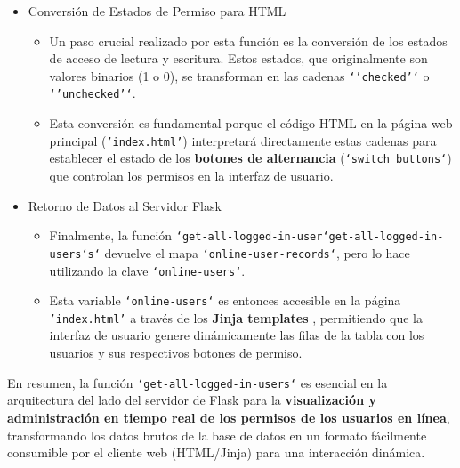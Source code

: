 \documentclass{report}
\begin{document}
\begin{itemize}
    \item Conversión de Estados de Permiso para HTML
        \begin{itemize}
            \item Un paso crucial realizado por esta función es la conversión de los estados de acceso de lectura y escritura. Estos estados, que originalmente 
            son valores binarios (1 o 0), se transforman en las cadenas \texttt{`'checked'`} o \texttt{`'unchecked'`}.
            \item Esta conversión es fundamental porque el código HTML en la página web principal (\texttt{'index.html'}) interpretará directamente estas 
            cadenas para establecer el estado de los \textbf{botones de alternancia} (\texttt{`switch buttons`}) que controlan los permisos en la interfaz 
            de usuario.
        \end{itemize}

    \item Retorno de Datos al Servidor Flask
        \begin{itemize}
            \item Finalmente, la función \texttt{`get-all-logged-in-user`get-all-logged-in-users`s`} devuelve el mapa \texttt{`online-user-records`}, 
            pero lo hace utilizando la clave \texttt{`online-users`}.
            \item Esta variable \texttt{`online-users`} es entonces accesible en la página \texttt{'index.html'} a través de los \textbf{ Jinja templates }, 
            permitiendo que la interfaz de usuario genere dinámicamente las filas de la tabla con los usuarios y sus respectivos botones de permiso.
        \end{itemize}
\end{itemize}

En resumen, la función \texttt{`get-all-logged-in-users`} es esencial en la arquitectura del lado del servidor de Flask para la \textbf{visualización y 
administración en tiempo real de los permisos de los usuarios en línea}, transformando los datos brutos de la base de datos en un formato fácilmente 
consumible por el cliente web (HTML/Jinja) para una interacción dinámica.
\end{document}
